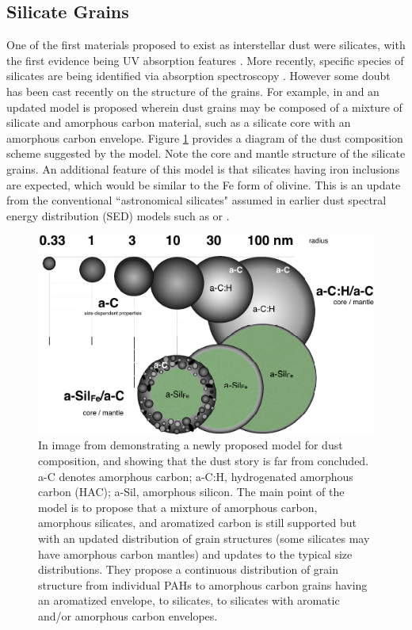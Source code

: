 \subsection{Silicate Grains}
     One of the first materials proposed to exist as interstellar dust were silicates, with the first evidence being UV absorption features \citep{knacke69}. More recently, specific species of silicates are being identified via absorption spectroscopy \citep{olofsson12}. However some doubt has been cast recently on the structure of the grains. For example, in \cite{jones13} and \cite{jones14} an updated model is proposed wherein dust grains may be composed of a mixture of silicate and amorphous carbon material, such as a silicate core with an amorphous carbon envelope. Figure \ref{Jones Dust} provides a diagram of the dust composition scheme suggested by the \cite{jones14}
 model. Note the core and mantle structure of the silicate grains. An additional feature of this model is that silicates having iron inclusions are expected, which would be similar to the Fe form of olivine.
      This is an update from the conventional ``astronomical  silicates" assumed in earlier dust spectral energy distribution (SED) models such as \cite{li01} or \cite{dustem11}.

\begin{figure}[htbp]
\begin{center}
\includegraphics[width=150mm]{EPS/aa21686-13-fig1.pdf}
\caption{
In image from \cite{jones14} demonstrating a newly proposed model for dust composition, and showing that the dust story is far from concluded. a-C denotes amorphous carbon; a-C:H, hydrogenated amorphous carbon (HAC); a-Sil, amorphous silicon. The main point of the model is to propose that a mixture of amorphous carbon, amorphous silicates, and aromatized carbon is still supported but with an updated distribution of grain structures (some silicates may have amorphous carbon mantles) and updates to the typical size distributions. They propose a continuous distribution of grain structure from individual PAHs to amorphous carbon grains having an aromatized envelope, to silicates, to silicates with aromatic and/or amorphous carbon envelopes.
 }
\label{Jones Dust}
\end{center}
\end{figure}
